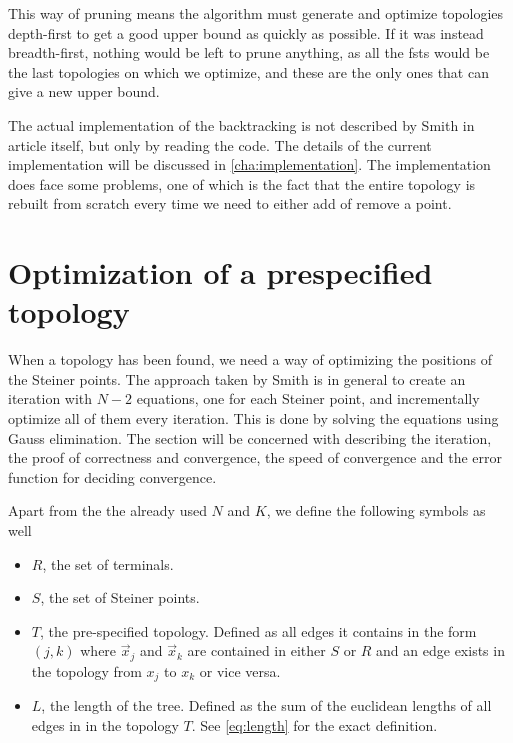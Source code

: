 This way of pruning means the algorithm must generate and optimize topologies
depth-first to get a good upper bound as quickly as possible.  If it was instead
breadth-first, nothing would  be left to prune anything, as all the \glspl{fst}
would be the last topologies on which we optimize, and these are the only ones
that can give a new upper bound.

The actual implementation of the backtracking is not described by Smith in
article itself, but only by reading the code.  The details of the current
implementation will be discussed in \cref{cha:implementation}.  The
implementation does face some problems, one of which is the fact that the entire
topology is rebuilt from scratch every time we need to either add of remove a
point.

\section{Optimization of a prespecified topology}
\label{sec:optim-presp-topol}

When a topology has been found, we need a way of optimizing the positions of the
Steiner points.  The approach taken by Smith is in general to create an
iteration with $N-2$ equations, one for each Steiner point, and incrementally
optimize all of them every iteration.  This is done by solving the equations
using Gauss elimination.  The section will be concerned with describing the
iteration, the proof of correctness and convergence, the speed of convergence
and the error function for deciding convergence.

Apart from the the already used $N$ and $K$, we define the following symbols as
well
%
\begin{itemize}
\item $R$, the set of terminals.
\item $S$, the set of Steiner points.
\item $T$, the pre-specified topology.  Defined as all edges it contains in the
form $(j,k)$ where $\vec x_j$ and $\vec x_k$ are contained in either $S$ or $R$
and an edge exists in the topology from $x_j$ to $x_k$ or vice versa.
\item $L$, the length of the tree.  Defined as the sum of the euclidean lengths
of all edges in in the topology $T$.  See \cref{eq:length} for the exact
definition.
\end{itemize}


